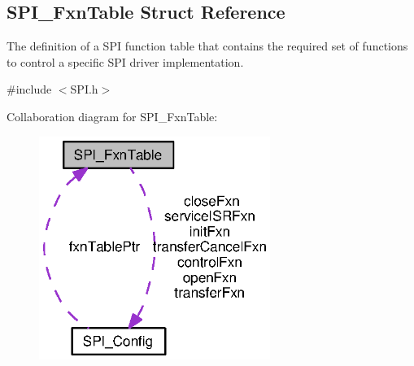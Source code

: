 \subsection{S\-P\-I\-\_\-\-Fxn\-Table Struct Reference}
\label{struct_s_p_i___fxn_table}


The definition of a S\-P\-I function table that contains the required set of functions to control a specific S\-P\-I driver implementation.  




{\ttfamily \#include $<$S\-P\-I.\-h$>$}



Collaboration diagram for S\-P\-I\-\_\-\-Fxn\-Table\-:
\nopagebreak
\begin{figure}[H]
\begin{center}
\leavevmode
\includegraphics[width=213pt]{struct_s_p_i___fxn_table__coll__graph}
\end{center}
\end{figure}
